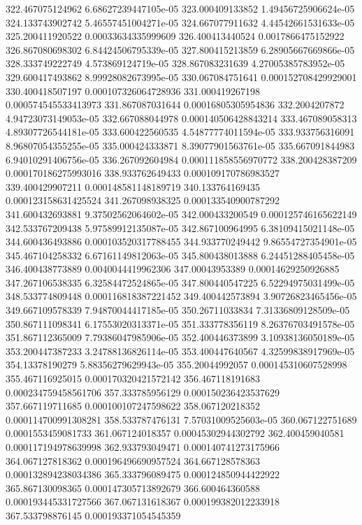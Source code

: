 {322.467075124962 6.68627239447105e-05
323.000409133852 1.49456725906624e-05
324.133743902742 5.46557451004271e-05
324.667077911632 4.44542661531633e-05
325.200411920522 0.00033634335999609
326.400413440524 0.0017866475152922
326.867080698302 6.84424506795339e-05
327.800415213859 6.28905667669866e-05
328.333749222749 4.573869124719e-05
328.867083231639 4.27005385783952e-05
329.600417493862 8.99928082673995e-05
330.067084751641 0.000152708429929001
330.400418507197 0.000107326064728936
331.000419267198 0.000574545533413973
331.867087031644 0.00016805305954836
332.2004207872 4.94723073149053e-05
332.667088044978 0.000140506428843214
333.467089058313 4.89307726544181e-05
333.600422560535 4.54877774011594e-05
333.933756316091 8.96807054355255e-05
335.000424333871 8.39077901563761e-05
335.667091844983 6.94010291406756e-05
336.267092604984 0.000111858556970772
338.200428387209 0.000170186275993016
338.933762649433 0.000109170786983527
339.400429907211 0.000148581148189719
340.133764169435 0.000123158631425524
341.267098938325 0.000133540900787292
341.600432693881 9.37502562064602e-05
342.000433200549 0.000125746165622149
342.533767209438 5.97589912135087e-05
342.867100964995 6.38109415021148e-05
344.600436493886 0.000103520317788455
344.933770249442 9.86554727354901e-05
345.467104258332 6.67161149812063e-05
345.800438013888 6.24451288405458e-05
346.400438773889 0.0040044419962306
347.00043953389 0.00014629250926885
347.267106538335 6.32584472524865e-05
347.800440547225 6.52294975031499e-05
348.533774809448 0.000116818387221452
349.400442573894 3.90726823465456e-05
349.667109578339 7.94870044417185e-05
350.26711033834 7.31336809128509e-05
350.867111098341 6.17553020313371e-05
351.333778356119 8.26376703491578e-05
351.867112365009 7.79386047985906e-05
352.400446373899 3.10938136050189e-05
353.200447387233 3.24788136826114e-05
353.400447640567 4.32599838917969e-05
354.13378190279 5.88356279629943e-05
355.20044992057 0.000145310607528998
355.467116925015 0.000170320421572142
356.467118191683 0.000234759458561706
357.333785956129 0.000150236423537629
357.667119711685 0.000100107247598622
358.067120218352 0.000114700991308281
358.533787476131 7.57031009525603e-05
360.067122751689 0.0001553459081733
361.067124018357 0.00045302944302792
362.400459040581 0.000117194978639998
362.933793049471 0.000140741273175966
364.067127818362 0.000196496690957524
364.667128578363 0.000132894238034386
365.333796089475 0.000124850944422922
365.867130098365 0.000147305713892679
366.600464360588 0.000193445331727566
367.067131618367 0.000199382012233918
367.533798876145 0.000193371054545359
}
